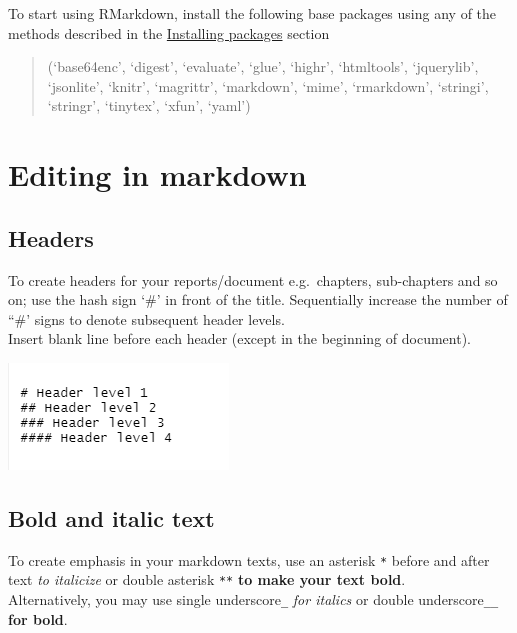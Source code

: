 \documentclass[
]{book}
\let\origfigure\figure
\let\endorigfigure\endfigure
\renewenvironment{figure}[1][2] {
    \expandafter\origfigure\expandafter[H]
} {
    \endorigfigure
}
\begin{document}
To start using RMarkdown, install the following base packages using any of the methods described in the \protect\hyperlink{installing-packages}{Installing packages} section

\begin{quote}
(`base64enc', `digest', `evaluate', `glue', `highr', `htmltools', `jquerylib', `jsonlite', `knitr', `magrittr', `markdown', `mime',
`rmarkdown', `stringi', `stringr', `tinytex', `xfun', `yaml')
\end{quote}

\hypertarget{editing-in-markdown}{%
\section{Editing in markdown}\label{editing-in-markdown}}

\hypertarget{headers}{%
\subsection{Headers}\label{headers}}

To create headers for your reports/document e.g.~chapters, sub-chapters and so on; use the hash sign `\#' in front of the title. Sequentially increase the number of ``\#' signs to denote subsequent header levels.\\
Insert blank line before each header (except in the beginning of document).

\begin{figure}
\centering
\includegraphics{tutorial_screenshots/headers.png}
\caption{headers}
\end{figure}

\hypertarget{bold-and-italic-text}{%
\subsection{Bold and italic text}\label{bold-and-italic-text}}

To create emphasis in your markdown texts, use an asterisk \texttt{*} before and after text \emph{to italicize} or double asterisk \texttt{**} \textbf{to make your text bold}.\\
Alternatively, you may use single underscore\texttt{\_} \emph{for italics} or double underscore\texttt{\_\_} \textbf{for bold}.
\end{document}
